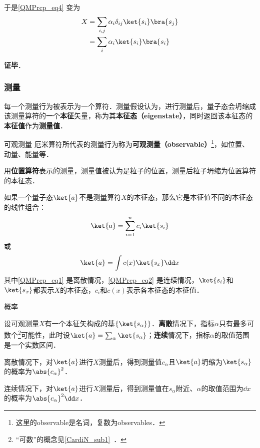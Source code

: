 于是\autoref{QMPrcp_eq4} 变为
\begin{equation}
\begin{aligned}
X&=\sum_{i, j}\alpha_i\delta_{ij}\ket{s_i}\bra{s_j}\\
&=\sum_i\alpha_i\ket{s_i}\bra{s_i}
\end{aligned}
\end{equation}



\textbf{证毕}．



















\subsubsection{测量}

每一个测量行为被表示为一个算符．测量假设认为，进行测量后，量子态会坍缩成该测量算符的一个\textbf{本征}矢量，称为其\textbf{本征态（eigenstate）}，同时返回该本征态的\textbf{本征值}作为\textbf{测量值}．


\begin{definition}{可观测量}\label{QMPrcp_def14}
厄米算符所代表的测量行为称为\textbf{可观测量（observable）}\footnote{这里的observable是名词，复数为observables．}，如位置、动量、能量等．
\end{definition}


\begin{example}{}
用\textbf{位置算符}表示的测量，测量值被认为是粒子的位置，测量后粒子坍缩为位置算符的本征态．
\end{example}

如果一个量子态$\ket{a}$不是测量算符$X$的本征态，那么它是本征值不同的本征态的线性组合：
\begin{equation}\label{QMPrcp_eq1}
\ket{a} = \sum_{i=1}^{n} c_i\ket{s_i}
\end{equation}
或
\begin{equation}\label{QMPrcp_eq2}
\ket{a} = \int c(x)\ket{s_x}\dd x
\end{equation}
其中\autoref{QMPrcp_eq1} 是离散情况，\autoref{QMPrcp_eq2} 是连续情况，$\ket{s_i}$和$\ket{s_x}$都表示$X$的本征态，$c_i$和$c(x)$表示各本征态的本征值．

\begin{definition}{概率}\label{QMPrcp_def15}

设可观测量$X$有一个本征矢构成的基$\{\ket{s_\alpha}\}$．\textbf{离散}情况下，指标$\alpha$只有最多可数个\footnote{“可数”的概念见\autoref{CardiN_sub1}~．}可能性，此时设$\ket{a}=\sum_{\alpha}\ket{s_\alpha}$；\textbf{连续}情况下，指标$\alpha$的取值范围是一个实数区间．

离散情况下，对$\ket{a}$进行$X$测量后，得到测量值$c_\alpha$且$\ket{a}$坍缩为$\ket{s_\alpha}$的概率为$\abs{c_\alpha}^2$．

连续情况下，对$\ket{a}$进行$X$测量后，得到测量值在$s_{\alpha}$附近、$\alpha$的取值范围为$\dd x$的概率为$\abs{c_\alpha}^2\dd x$．
\end{definition}


